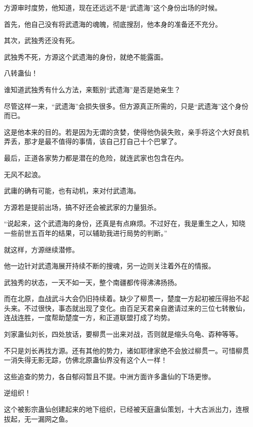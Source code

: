 
\begin{this_body}



方源审时度势，他知道，现在还远远不是“武遗海”这个身份出场的时候。

首先，他自己没有将武遗海的魂魄，彻底搜刮，他本身的准备还不充分。

其次，武独秀还没有死。

武独秀不死，方源这个武遗海的身份，就绝不能露面。

八转蛊仙！

谁知道武独秀有什么方法，来甄别“武遗海”是否是她亲生？

尽管这样一来，“武遗海”会损失很多。但方源真正所需的，只是“武遗海”这个身份而已。

这是他本来的目的。若是因为无谓的贪婪，使得他伪装失败，亲手将这个大好良机弄丢，那才是最不值得的事情，该自己打自己十个巴掌了。

最后，正道各家势力都是潜在的危险，就连武家也包含在内。

无风不起浪。

武庸的确有可能，也有动机，来对付武遗海。

方源若是提前出场，搞不好还会被武家的力量狙杀。

“说起来，这个武遗海的身份，还真是有点麻烦。不过好在，我是重生之人，知晓一些前世五百年的结果，可以辅助我进行局势的判断。”

就这样，方源继续潜修。

他一边针对武遗海展开持续不断的搜魂，另一边则关注着外在的情报。

武独秀的状态，一天不如一天，整个南疆都传得沸沸扬扬。

而在北原，血战武斗大会仍旧持续着。缺少了柳贯一，楚度一方起初被压得抬不起头来。不过很快，事态就出现了变化。由百足天君亲自邀请过来的三位七转散仙，连战连胜，一度帮助楚度一方，和正道联盟打成了均势。

刘家蛊仙刘长，四处放话，要柳贯一出来对战，否则就是缩头乌龟、孬种等等。

不只是刘长再找方源。还有其他的势力，诸如耶律家绝不会放过柳贯一。可惜柳贯一消失得无影无踪，仿佛北原蛊仙界没有这个人一样！

这些追查的势力，各自郁闷暂且不提。中洲方面许多蛊仙的下场更惨。

逆组织！

这个被影宗蛊仙创建起来的地下组织，已经被天庭蛊仙策划，十大古派出力，连根拔起，无一漏网之鱼。


\end{this_body}

